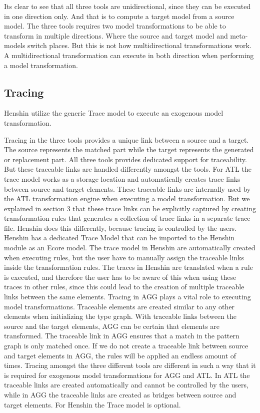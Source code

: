 Its clear to see that all three tools are unidirectional, since they can be
executed in one direction only. And that is to compute a target model from a
source model. The three tools requires two model transformations to be able to
transform in multiple directions. Where the source and target model and
meta-models switch places. But this is not how multidirectional transformations
work. A multidirectional transformation can execute in both direction when
performing a model transformation.

\subsection{Tracing}

Henshin utilize the generic Trace model to execute an exogenous model
transformation. 

Tracing in the three tools provides a unique link
between a source and a target. The source represents the matched part while the
target represents the generated or replacement part. All three tools provides
dedicated support for traceability. But these traceable links are handled
differently amongst the tools. For ATL the trace model works as a storage
location and automatically creates trace links between source and target
elements. These traceable links are internally used by the ATL
transformation engine when executing a model transformation. But we explained in
section 3 that these trace links can be explicitly captured by creating
transformation rules that generates a collection of trace links in a
separate trace file. Henshin does this differently, because tracing is
controlled by the users. Henshin has a dedicated Trace Model that can be
imported to the Henshin module as an Ecore model. The trace model in Henshin
are automatically created when executing rules, but the user have to manually
assign the traceable links inside the transformation rules. The traces in
Henshin are translated when a rule is executed, and therefore the user has to
be aware of this when using these traces in other rules, since this
could lead to the creation of multiple traceable links between the same
elements. Tracing in AGG plays a vital role to executing model transformations.
Traceable elements are created similar to any other elements when initializing
the type graph. With traceable links between the source and the
target elements, AGG can be certain that elements are transformed. The traceable
link in AGG ensures that a match in the pattern graph is only matched once. If we do
not create a traceable link between source and target elements in AGG, the
rules will be applied an endless amount of times. Tracing amongst the three
different tools are different in such a way that it is required for exogenous
model transformations for AGG and ATL. In ATL the traceable links are created
automatically and cannot be controlled by the users, while in AGG the traceable
links are created as bridges between source and target elements. For Henshin
the Trace model is optional. 

